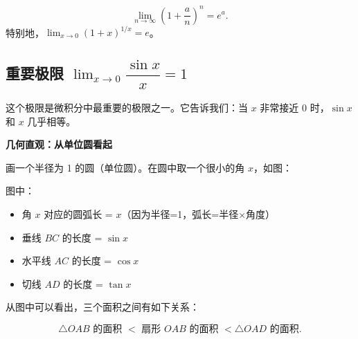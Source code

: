 \documentclass{ctexart}
\newenvironment{custom}[1]{\par\noindent \textbf{#1}\quad}{\par\vspace{1em}}
\begin{document}
\begin{theorem}[第一个重要极限的推广]
\[
\lim_{n\to\infty} \left(1 + \dfrac{a}{n}\right)^n = e^a.
\]
特别地，\(\lim_{x\to 0} (1+x)^{1/x} = e\)。
\end{theorem}

\subsection{重要极限 \(\lim_{x \to 0} \dfrac{\sin x}{x} = 1\)}

这个极限是微积分中最重要的极限之一。它告诉我们：当 \(x\) 非常接近 0 时，\(\sin x\) 和 \(x\) 几乎相等。

\begin{custom}{几何直观：从单位圆看起}

画一个半径为 1 的圆（单位圆）。在圆中取一个很小的角 \(x\)，如图：

\begin{center}
\end{center}

图中：
\begin{itemize}
\item 角 \(x\) 对应的圆弧长 = \(x\)（因为半径=1，弧长=半径×角度）
\item 垂线 \(BC\) 的长度 = \(\sin x\)
\item 水平线 \(AC\) 的长度 = \(\cos x\)
\item 切线 \(AD\) 的长度 = \(\tan x\)
\end{itemize}

从图中可以看出，三个面积之间有如下关系：

\[
\triangle OAB \text{ 的面积 } < \text{ 扇形 } OAB \text{ 的面积 } < \triangle OAD \text{ 的面积}.
\]

\end{custom}
\end{document}
